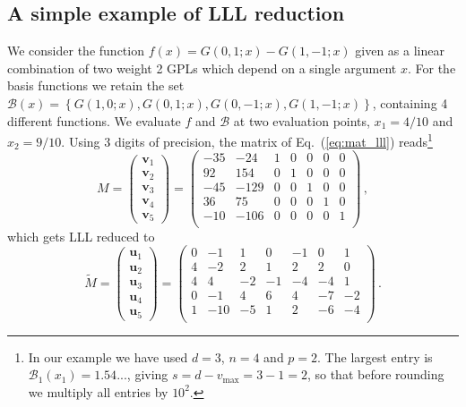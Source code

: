 \documentclass[a4paper,11pt]{article}
\begin{document}
 \subsection{A simple example of LLL reduction}\label{sec:app_simple_example_lll} 
We consider the function $f(x) = G(0,1;x)- G(1,-1;x)$ given as a linear combination of two weight 2 GPLs which depend on a single argument $x$. For the basis functions  we retain the set $\mathbf{\mathcal{B}}(x)=\left\{G(1,0;x),G(0,1;x), G(0,-1;x), G(1,-1;x) \right\}$, containing 4 different functions. We evaluate $f$ and $\mathbf{\mathcal{B}}$ at two evaluation points, $x_1=4/10$ and $x_2=9/10$. Using $3$ digits of precision, the matrix of Eq.~(\ref{eq:mat_lll}) reads\footnote{In our example we have used $d=3$, $n=4$ and $p=2$. The largest entry is $\mathcal{B}_1(x_1)=1.54...$, giving $s=d-v_\text{max}=3-1=2$, so that before rounding we multiply all entries by $10^2$.}  
\begin{equation}
    M=\begin{pmatrix}
        \mathbf{v}_1\\
        \mathbf{v}_2\\
        \mathbf{v}_3\\
        \mathbf{v}_4\\
        \mathbf{v}_5
    \end{pmatrix}=\left(
\begin{array}{ccccccc}
 -35 & -24 & 1 & 0 & 0 & 0 & 0 \\
 92 & 154 & 0 & 1 & 0 & 0 & 0 \\
 -45 & -129 & 0 & 0 & 1 & 0 & 0 \\
 36 & 75 & 0 & 0 & 0 & 1 & 0 \\
 -10 & -106 & 0 & 0 & 0 & 0 & 1 \\
\end{array}
\right) \,,
\end{equation}
which gets LLL reduced to 
\begin{equation}
    \tilde{M} =\begin{pmatrix}
        \mathbf{u}_1\\
        \mathbf{u}_2\\
        \mathbf{u}_3\\
        \mathbf{u}_4\\
        \mathbf{u}_5
    \end{pmatrix}= \left(
\begin{array}{ccccccc}
 0 & -1 & 1 & 0 & -1 & 0 & 1 \\
 4 & -2 & 2 & 1 & 2 & 2 & 0 \\
4 & 4 & -2 & -1 & -4 & -4 & 1 \\
 0 & -1 & 4 & 6 & 4 & -7 & -2 \\
1 & -10 & -5 & 1 & 2 & -6 & -4 \\
\end{array}
\right) \,.
\end{equation}
\end{document}

